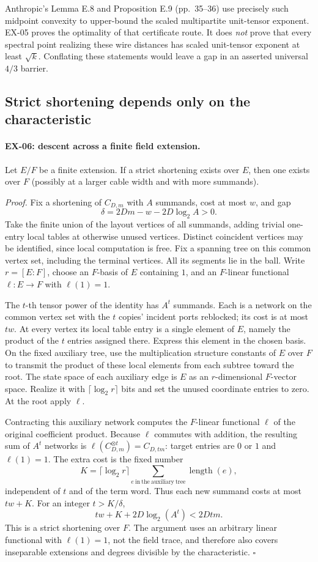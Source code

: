 Anthropic's Lemma E.8 and Proposition E.9 (pp.~35--36) use precisely such
midpoint convexity to upper-bound the scaled multipartite unit-tensor exponent.
EX-05 proves the optimality of that certificate route.  It does \emph{not}
prove that every spectral point realizing these wire distances has scaled
unit-tensor exponent at least $\sqrt k$.  Conflating these statements would
leave a gap in an asserted universal $4/3$ barrier.

\subsection{Strict shortening depends only on the characteristic}
\label{sec:ex-field}

\paragraph{EX-06: descent across a finite field extension.}
Let $E/F$ be a finite extension.  If a strict shortening exists over $E$, then
one exists over $F$ (possibly at a larger cable width and with more summands).

\emph{Proof.}
Fix a shortening of $C_{D,m}$ with $A$ summands, cost at most $w$, and gap
\[
 \delta=2Dm-w-2D\log_2 A>0.
\]
Take the finite union of the layout vertices of all summands, adding trivial
one-entry local tables at otherwise unused vertices.  Distinct coincident
vertices may be identified, since local computation is free.  Fix a spanning
tree on this common vertex set, including the terminal vertices.  All its
segments lie in the ball.  Write $r=[E:F]$, choose an $F$-basis of $E$ containing
$1$, and an $F$-linear functional $\ell:E\to F$ with $\ell(1)=1$.

The $t$-th tensor power of the identity has $A^t$ summands.  Each is a network
on the common vertex set with the $t$ copies' incident ports reblocked; its cost
is at most $tw$.  At every vertex its local table entry is a single element of
$E$, namely the product of the $t$ entries assigned there.  Express this element
in the chosen basis.  On the fixed auxiliary tree, use the multiplication
structure constants of $E$ over $F$ to transmit the product of these local
elements from each subtree toward the root.  The state space of each auxiliary
edge is $E$ as an $r$-dimensional $F$-vector space.  Realize it with
$\lceil\log_2 r\rceil$ bits and set the unused coordinate entries to zero.
At the root apply $\ell$.

Contracting this auxiliary network computes the $F$-linear functional $\ell$
of the original coefficient product.  Because $\ell$ commutes with addition,
the resulting sum of $A^t$ networks is
$\ell(C_{D,m}^{\otimes t})=C_{D,tm}$: target entries are $0$ or $1$ and
$\ell(1)=1$.  The extra cost is the fixed number
\[
 K=\lceil\log_2 r\rceil
       \sum_{e\ \mathrm{in\ the\ auxiliary\ tree}}\operatorname{length}(e),
\]
independent of $t$ and of the term word.  Thus each new summand costs at most
$tw+K$.  For an integer $t>K/\delta$,
\[
 tw+K+2D\log_2(A^t)<2Dtm.
\]
This is a strict shortening over $F$.  The argument uses an arbitrary linear
functional with $\ell(1)=1$, not the field trace, and therefore also covers
inseparable extensions and degrees divisible by the characteristic.
\hfill$\square$

